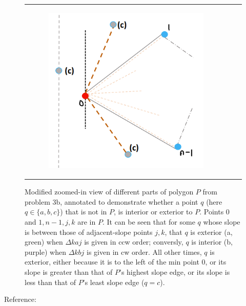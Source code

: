 \documentclass [12pt]{article}
\begin{document}
\begin{enumerate}[label=(\alph*)]
\begin{figure}[h]
\begin{tabular}{ccc}
\begin{subfigure}{0.33\textwidth}
                    \centering
                    \includegraphics[width=1\textwidth]{images/3c2c.PNG}
                    \label{subfig:3c2c}
                \end{subfigure} 
            \end{tabular}
            \caption{Modified zoomed-in view of different parts of polygon $P$ from problem 3b, annotated to demonstrate whether a point $q$ (here $q \in \{a, b, c\}$) that is not in $P$, is interior or exterior to $P$. Points 0 and $1, n-1, j, k$ are in $P$. It can be seen that for some $q$ whose slope is between those of adjacent-slope points $j, k$, that $q$ is exterior (a, green) when $\Delta kaj$ is given in ccw order; conversly, $q$ is interior (b, purple) when $\Delta kbj$ is given in cw order. All other times, $q$ is exterior, either because it is to the left of the min point 0, or its slope is greater than that of $P$'s highest slope edge, or its slope is less than that of $P$'s least slope edge ($q = c$).}
            \label{fig:3c2}
        \end{figure}



        Reference: \cite{officehours}

    \end{enumerate}


    \pagebreak
\end{document}
